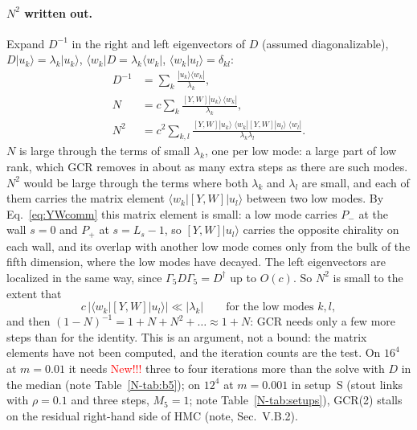\documentclass[11pt,a4paper]{article}
\numberwithin{equation}{section}
\newcommand{\dg}{^{\dagger}}
\newcommand{\Pp}{P_{+}}
\newcommand{\Pm}{P_{-}}
\newcommand{\Gfive}{\Gamma_5}
\begin{document}
\paragraph{$N^2$ written out.} Expand $D^{-1}$ in the right and left eigenvectors of $D$
(assumed diagonalizable), $D|u_k\rangle=\lambda_k|u_k\rangle$, $\langle w_k|D=\lambda_k\langle w_k|$,
$\langle w_k|u_l\rangle=\delta_{kl}$:
\begin{align}
D^{-1}&=\sum_k\frac{|u_k\rangle\langle w_k|}{\lambda_k},\nonumber\\
N&=c\sum_k\frac{[Y,W]|u_k\rangle\,\langle w_k|}{\lambda_k},\nonumber\\
N^2&=c^2\sum_{k,l}\frac{[Y,W]|u_k\rangle\;\langle w_k|[Y,W]|u_l\rangle\;\langle w_l|}{\lambda_k\lambda_l} .
\end{align}
$N$ is large through the terms of small $\lambda_k$, one per low mode: a large part of low rank,
which GCR removes in about as many extra steps as there are such modes. $N^2$ would be large
through the terms where both $\lambda_k$ and $\lambda_l$ are small, and each of them carries the
matrix element $\langle w_k|[Y,W]|u_l\rangle$ between two low modes. By Eq.~\eqref{eq:YWcomm}
this matrix element is small: a low mode carries $\Pm$ at the wall $s=0$ and $\Pp$ at
$s=L_s-1$, so $[Y,W]|u_l\rangle$ carries the opposite chirality on each wall, and its overlap with
another low mode comes only from the bulk of the fifth dimension, where the low modes have
decayed. The left eigenvectors are localized in the same way, since $\Gfive D\Gfive=D\dg$ up to
$O(c)$. So $N^2$ is small to the extent that
\begin{equation}
c\,\big|\langle w_k|[Y,W]|u_l\rangle\big|\ll|\lambda_k|\qquad\text{for the low modes }k,l,
\end{equation}
and then $(1-N)^{-1}=1+N+N^2+\dots\approx1+N$: GCR needs only a few more steps than for the
identity. This is an argument, not a bound: the matrix elements have not been computed, and the
iteration counts are the test. On $16^4$ at $m=0.01$ it needs \textcolor{red}{New!!!} three to four iterations more than the solve with $D$ in the median (note
Table~\ref{N-tab:b5}); on $12^4$ at $m=0.001$ in setup~S (stout links with $\rho=0.1$ and three steps, $M_5=1$; note Table~\ref{N-tab:setups}), GCR(2) stalls on the residual right-hand side of HMC (note, Sec.~V.B.2).
\end{document}
